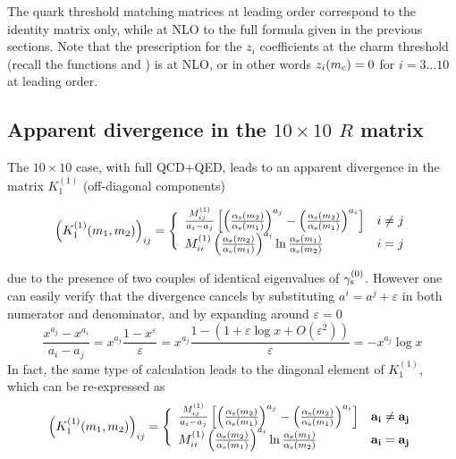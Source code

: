 The quark threshold matching matrices at leading order correspond to the 
identity matrix only, while at NLO to the full formula given in the previous sections.
Note that the prescription for the $z_i$ coefficients at the charm threshold 
(recall the functions  and ) is at NLO, or in other words 
$z_i(m_{\mathrm c})=0$ for $i=3 \ldots 10$ at leading order.

\subsection{Apparent divergence in the $10 \times 10$ $R$ matrix}

The $10 \times 10$ case, with full QCD+QED, leads to an apparent
divergence in the matrix $K_1^{(1)}$ (off-diagonal components)

\begin{equation}
\left( K_1^{(1)}(m_1,m_2) \right)_{ij} =
\Bigg\lbrace
\begin{array}{ll}
\frac{M^{(1)}_{ij}}{a_i - a_j}
\left[ \left( \frac{\alpha_{\rm s}(m_2)}{\alpha_{\rm s}(m_1)} \right)^{a_j} -
       \left( \frac{\alpha_{\rm s}(m_2)}{\alpha_{\rm s}(m_1)} \right)^{a_i} \right] & i \not= j \\
M^{(1)}_{ii} \left( \frac{\alpha_{\rm s}(m_2)}{\alpha_{\rm s}(m_1)} \right)^{a_i}
             \ln\frac{\alpha_{\rm s}(m_1)}{\alpha_{\rm s}(m_2)}             & i=j
\end{array} 
\end{equation}

due to the presence of two couples of identical eigenvalues of $\gamma_{\rm s}^{(0)}$. 
However one can easily verify that the divergence cancels 
by substituting $a^i = a^j + \varepsilon$ in both numerator and denominator, 
and by expanding around $\varepsilon =0$
\begin{equation}
\frac{x^{a_j} - x^{a_i}}{a_i - a_j} = x^{a_j} \frac{1 - x^\varepsilon}{\varepsilon} 
 = x^{a_j} \frac{1 - (1 + \varepsilon \log x + O(\varepsilon^2))}{\varepsilon} = 
- x^{a_j} \log x
\end{equation}
In fact, the same type of calculation leads to the diagonal element of $K_1^{(1)}$,
which can be re-expressed as
\begin{equation}
\left( K_1^{(1)}(m_1,m_2) \right)_{ij} =
\Bigg\lbrace
\begin{array}{ll}
\frac{M^{(1)}_{ij}}{a_i - a_j}
\left[ \left( \frac{\alpha_{\rm s}(m_2)}{\alpha_{\rm s}(m_1)} \right)^{a_j} -
       \left( \frac{\alpha_{\rm s}(m_2)}{\alpha_{\rm s}(m_1)} \right)^{a_i} \right] & \mathbf{a_i \not= a_j} \\
M^{(1)}_{ii} \left( \frac{\alpha_{\rm s}(m_2)}{\alpha_{\rm s}(m_1)} \right)^{a_i}
             \ln\frac{\alpha_{\rm s}(m_1)}{\alpha_{\rm s}(m_2)}             & \mathbf{ a_i=a_j}
\end{array} 
\end{equation}


